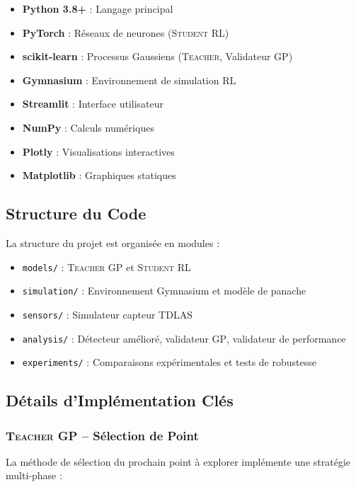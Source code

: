 \documentclass[12pt,a4paper]{article}
\newcommand{\teacher}{\textsc{Teacher}}
\newcommand{\student}{\textsc{Student}}
\newcommand{\gp}{\textsc{GP}}
\newcommand{\rl}{\textsc{RL}}
\begin{document}
\begin{itemize}
    \item \textbf{Python 3.8+} : Langage principal
    \item \textbf{PyTorch} : Réseaux de neurones (\student{} \rl{})
    \item \textbf{scikit-learn} : Processus Gaussiens (\teacher{}, Validateur \gp{})
    \item \textbf{Gymnasium} : Environnement de simulation \rl{}
    \item \textbf{Streamlit} : Interface utilisateur
    \item \textbf{NumPy} : Calculs numériques
    \item \textbf{Plotly} : Visualisations interactives
    \item \textbf{Matplotlib} : Graphiques statiques
\end{itemize}

\subsection{Structure du Code}

La structure du projet est organisée en modules :

\begin{itemize}
    \item \texttt{models/} : \teacher{} \gp{} et \student{} \rl{}
    \item \texttt{simulation/} : Environnement Gymnasium et modèle de panache
    \item \texttt{sensors/} : Simulateur capteur TDLAS
    \item \texttt{analysis/} : Détecteur amélioré, validateur \gp{}, validateur de performance
    \item \texttt{experiments/} : Comparaisons expérimentales et tests de robustesse
\end{itemize}

\subsection{Détails d'Implémentation Clés}

\subsubsection{\teacher{} \gp{} -- Sélection de Point}

La méthode de sélection du prochain point à explorer implémente une stratégie multi-phase :
\end{document}
